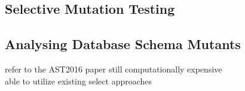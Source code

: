 \documentclass[conference]{IEEEtran}
\begin{document}
\subsection{Selective Mutation Testing}
%
%
%

\subsection{Analysing Database Schema Mutants}
refer to the AST2016 paper
still computationally expensive\\
able to utilize existing select approaches
\end{document}

